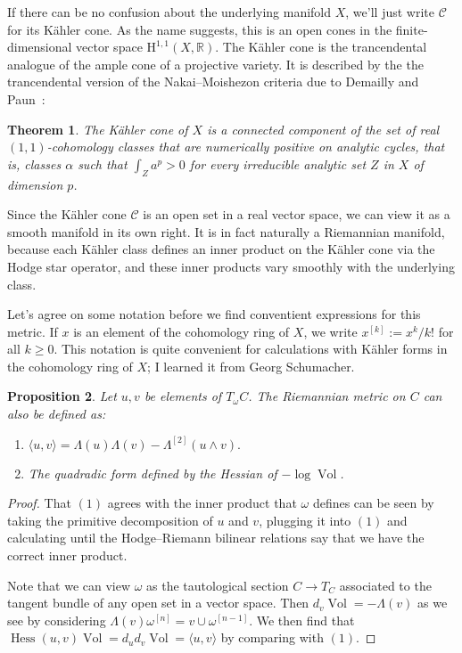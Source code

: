 \documentclass[12pt,a4paper]{amsart}
\newtheorem{theo}{Theorem}[section]
\newtheorem{prop}[theo]{Proposition}
\theoremstyle{definition}
\theoremstyle{remark}
\newcommand{\RR}{\mathbb{R}}
\newcommand{\Vol}{\mathop{\mathrm{Vol}}}
\def\coho#1{\mathrm{H}^{#1}}
\def\kf{\omega}
\def\Lef{\Lambda}
\def\ton{u}
\def\ttw{v}
\def\^#1{^{[#1]}}
\def\KC{C}
\def\RKC{\mathcal{\KC}}
\begin{document}
If there can be no confusion about the underlying manifold $X$, we'll
just write $\RKC$ for its K\"{a}hler cone.  As the name suggests, this is
an open cones in the finite-dimensional vector space
$\coho{1,1}(X,\RR)$. The K\"{a}hler cone is the trancendental analogue
of the ample cone of a projective variety. It is described by the the
trancendental version of the Nakai--Moishezon criteria due to Demailly
and Paun~\cite{DemaillyPaun}:


\begin{theo}
The K\"{a}hler cone of $X$ is a connected component of the set of real
$(1,1)$-cohomology classes that are numerically positive on analytic
cycles, that is, classes $\alpha$ such that $\int_{Z} a^p > 0$ for every
irreducible analytic set $Z$ in $X$ of dimension $p$.
\end{theo}



Since the K\"{a}hler cone $\RKC$ is an open set in a real vector space,
we can view it as a smooth manifold in its own right. It is in fact
naturally a Riemannian manifold, because each K\"{a}hler class defines an
inner product on the K\"{a}hler cone via the Hodge star operator, and these inner
products vary smoothly with the underlying class.


Let's agree on some notation before we find conventient expressions for
this metric. If $x$ is an element of the cohomology ring of $X$, we
write $x\^k := x^k/k!$ for all $k \geq 0$. This notation is
quite convenient for calculations with K\"{a}hler forms in the cohomology
ring of $X$; I learned it from Georg Schumacher.


\begin{prop}
Let $\ton,\ttw$ be elements of $T_{\kf}C$. The Riemannian metric on $C$
can also be defined as:
\begin{enumerate}
    \item
\hfil
$
\langle \ton, \ttw \rangle
= \Lef(\ton)\Lef(\ttw)
- \Lef\^2(\ton\wedge\ttw).
$
\hfil

    \item
The quadradic form defined by the Hessian of $-\log\Vol$.
\end{enumerate}
\end{prop}


\begin{proof}
That $(1)$ agrees with the inner product that $\kf$ defines can be seen by
taking the primitive decomposition of $\ton$ and $\ttw$, plugging it into $(1)$
and calculating until the Hodge--Riemann bilinear relations say that we have the
correct inner product.

Note that we can view $\kf$ as the tautological section $C \to T_C$
associated to the tangent bundle of any open set in a vector space.
Then $d_{\ttw} \Vol = -\Lef(\ttw)$ as we see by considering
$\Lef(\ttw) \kf\^n = \ttw \cup \kf\^{n-1}$. We then find that
$\operatorname{Hess}(\ton,\ttw) \Vol 
= d_{\ton} d_{\ttw}\Vol = \langle \ton, \ttw \rangle$ by comparing with
$(1)$.
\end{proof}
\end{document}
